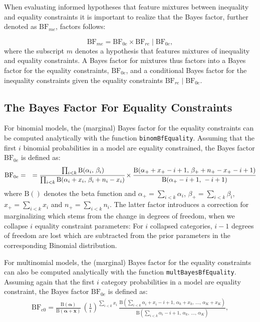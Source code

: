 \documentclass[
  english,
  man,floatsintext]{apa6}
\begin{document}
When evaluating informed hypotheses that feature mixtures between inequality and equality constraints it is important to realize that the Bayes factor, further denoted as \(\text{BF}_{me}\), factors follows:

\[
\text{BF}_{me}
= \text{BF}_{0e} \times \text{BF}_{re} \mid \text{BF}_{0e},
\]
where the subscript \(m\) denotes a hypothesis that features mixtures of inequality and equality constraints. A Bayes factor for mixtures thus factors into a Bayes factor for the equality constraints, \(\text{BF}_{0e}\), and a conditional Bayes factor for the inequality constraints given the equality constraints \(\text{BF}_{re} \mid \text{BF}_{0e}\).

\hypertarget{the-bayes-factor-for-equality-constraints}{%
\subsection{The Bayes Factor For Equality Constraints}\label{the-bayes-factor-for-equality-constraints}}

For binomial models, the (marginal) Bayes factor for the equality constraints can be computed analytically with the function \texttt{binomBfEquality}. Assuming that the first \(i\) binomial probabilities in a model are equality constrained, the Bayes factor \(\text{BF}_{0e}\) is defined as:
\begin{align*}
\text{BF}_{0e} &=
&= \cfrac{\prod_{i < k} \text{B}(\alpha_i\text{, } \beta_i)}{\prod_{i < k} \text{B}(\alpha_i + x_i\text{, } \beta_i + n_i - x_i)} \times \cfrac{\text{B}(\alpha_+ + x_+ - i + 1\text{, } \beta_+ + n_+ - x_+ - i + 1)}{\text{B}(\alpha_+ - i + 1\text{, } - i + 1)}
\end{align*}
where \(\text{B}()\) denotes the beta function and \(\alpha_+ = \sum_{i<k}\alpha_i\), \(\beta_+ = \sum_{i<k}\beta_i\), \(x_+ = \sum_{i<k} x_i\) and \(n_+ = \sum_{i<k} n_i\). The latter factor introduces a correction for marginalizing which stems from the change in degrees of freedom, when we collapse \(i\) equality constraint parameters: For \(i\) collapsed categories, \(i - 1\) degrees of freedom are lost which are subtracted from the prior parameters in the corresponding Binomial distribution.

For multinomial models, the (marginal) Bayes factor for the equality constraints can also be computed analytically with the function \texttt{multBayesBfEquality}. Assuming again that the first \(i\) category probabilities in a model are equality constraint, the Bayes factor \(\text{BF}_{0e}\) is defined as:
\begin{align*}
\text{BF}_{e0} = \frac{\text{B}(\boldsymbol{\alpha})}{\text{B}(\boldsymbol{\alpha}+\mathbf{x})} \, \left(\frac{1}{i}\right)^{\sum_{i<k} x_i}\,\frac{\text{B}\left(\sum_{i<k}\alpha_i+x_i - i + 1\text{, }\alpha_{k}+x_{k}\text{, }\dots\text{, }\alpha_K+x_K\right)}{
 \text{B}\left(\sum_{i<k}\alpha_i - i + 1\text{, }\alpha_{k}\text{, }\dots\text{, }\alpha_K\right)},
\end{align*}
\end{document}
